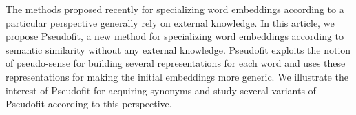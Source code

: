The methods proposed recently for specializing word embeddings according to a particular perspective generally rely on external knowledge. In this article, we propose Pseudofit, a new method for specializing word embeddings according to semantic similarity without any external knowledge. Pseudofit exploits the notion of pseudo-sense for building several representations for each word and uses these representations for making the initial embeddings more generic. We illustrate the interest of Pseudofit for acquiring synonyms and study several variants of Pseudofit according to this perspective.
